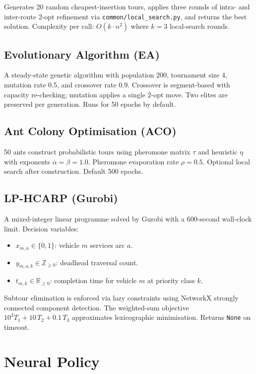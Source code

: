 \documentclass[11pt,a4paper]{article}
\begin{document}
Generates 20 random cheapest-insertion tours, applies three rounds of intra- and
inter-route 2-opt refinement via \texttt{common/local\_search.py}, and returns
the best solution. Complexity per call: $O(k \cdot n^2)$ where $k=3$ local-search
rounds.

\subsection{Evolutionary Algorithm (EA)}

A steady-state genetic algorithm with population 200, tournament size 4, mutation
rate 0.5, and crossover rate 0.9. Crossover is segment-based with capacity
re-checking; mutation applies a single 2-opt move. Two elites are preserved per
generation. Runs for 50 epochs by default.

\subsection{Ant Colony Optimisation (ACO)}

50 ants construct probabilistic tours using pheromone matrix $\tau$ and heuristic
$\eta$ with exponents $\alpha=\beta=1.0$. Pheromone evaporation rate $\rho=0.5$.
Optional local search after construction. Default 500 epochs.

\subsection{LP-HCARP (Gurobi)}

A mixed-integer linear programme solved by Gurobi with a 600-second wall-clock
limit. Decision variables:
\begin{itemize}[nosep]
  \item $x_{m,a} \in \{0,1\}$: vehicle $m$ services arc $a$.
  \item $y_{m,a,k} \in \mathbb{Z}_{\geq 0}$: deadhead traversal count.
  \item $t_{m,k} \in \mathbb{R}_{\geq 0}$: completion time for vehicle $m$ at
        priority class $k$.
\end{itemize}
Subtour elimination is enforced via lazy constraints using NetworkX strongly
connected component detection. The weighted-sum objective $10^3 T_1 + 10\,T_2 +
0.1\,T_3$ approximates lexicographic minimisation. Returns \texttt{None} on
timeout.

\section{Neural Policy}
\end{document}
